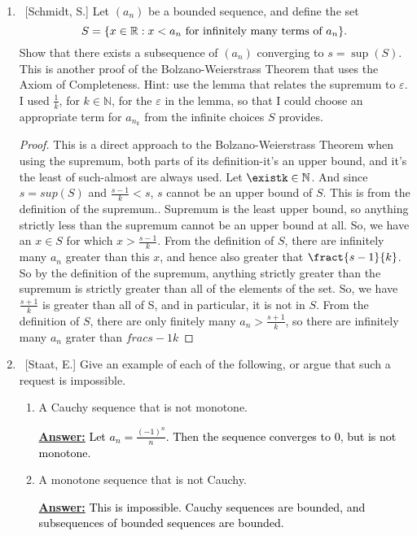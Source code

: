 \documentclass[10pt]{article}
\theoremstyle{definition}
\begin{document}
\begin{enumerate}
\item  ~[Schmidt, S.] Let $(a_n)$ be a bounded sequence, and define the set $$S = \{ x \in \mathbb{R}: x < a_n \textnormal{ for infinitely many terms of } a_n \}.$$  Show that there exists a subsequence of $(a_n)$ converging to $s = \sup{(S)}$.  This is another proof of the Bolzano-Weierstrass Theorem that uses the Axiom of Completeness.  Hint: use the lemma that relates the supremum to $\varepsilon$.  I used $\frac{1}{k}$, for $k \in \mathbb{N}$, for the $\varepsilon$ in the lemma, so that I could choose an appropriate term for $a_{n_k}$ from the infinite choices $S$ provides.
\begin{proof}
This is a direct approach to the Bolzano-Weierstrass Theorem when using the supremum, both parts of its definition-it's an upper bound, and it's the least of such-almost are always used.  Let $\existk \in \mathbb{N}$.  And since $s=sup(S)$ and $\frac{s-1}{k}<s$, $s$ cannot be an upper bound of $S$.  This is from the definition of the supremum..  Supremum is the least upper bound, so anything strictly less than the supremum cannot be an upper bound at all.  So, we have an $x \in S$ for which $x>\frac{s-1}{k}$.  From the definition of $S$, there are infinitely many $a_n$ greater than this $x$, and hence also greater that $\fract{s-1}{k}$.  So by the definition of the supremum, anything strictly greater than the supremum is strictly greater than all of the elements of the set.  So, we have $\frac{s+1}{k}$ is greater than all of S, and in particular, it is not in $S$.  From the definition of $S$, there are only finitely many $a_n > \frac{s+1}{k}$, so there are infinitely many $a_n$ grater than $frac{s-1}{k}$
\end{proof}
	
	
\item  ~[Staat, E.] Give an example of each of the following, or argue that such a request is impossible.

	\begin{enumerate}
	
	\item  A Cauchy sequence that is not monotone.
  
  \textbf{\underline{Answer:}}
  \textcolor{black}{Let $a_n = \frac{(-1)^n}{n}$.  Then the sequence converges to 0, but is not monotone.}
	
	\item  A monotone sequence that is not Cauchy.
   
   \textbf{\underline{Answer:}}
   \textcolor{black}{This is impossible.  Cauchy sequences are bounded, and subsequences of bounded sequences are bounded.}
	

\end{enumerate}
\end{enumerate}
\end{document}
